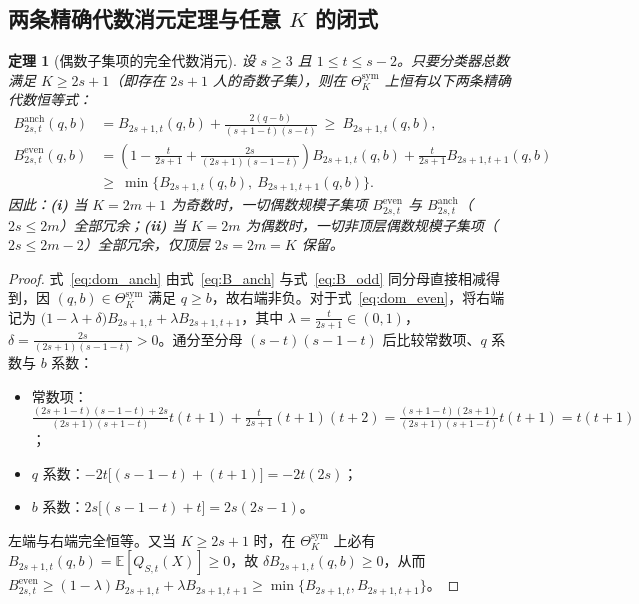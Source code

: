 \documentclass[11pt,a4paper]{article}
\newtheorem{theorem}{定理}[section]
\theoremstyle{definition}
\theoremstyle{remark}
\newcommand{\Thetasym}{\Theta^{\mathrm{sym}}_K}
\begin{document}
\subsection{两条精确代数消元定理与任意 $K$ 的闭式}

\begin{theorem}[偶数子集项的完全代数消元]\label{thm:even_dom}
设 $s \ge 3$ 且 $1 \le t \le s - 2$。只要分类器总数满足 $K \ge 2s + 1$（即存在 $2s+1$ 人的奇数子集），则在 $\Thetasym$ 上恒有以下两条精确代数恒等式：
\begin{align}
  B^{\mathrm{anch}}_{2s, t}(q, b) &= B_{2s+1, t}(q, b) + \frac{2(q - b)}{(s + 1 - t)(s - t)} \ \ge\ B_{2s+1, t}(q, b), \label{eq:dom_anch} \\
  B^{\mathrm{even}}_{2s, t}(q, b) &= \left(1 - \frac{t}{2s+1} + \frac{2s}{(2s+1)(s - 1 - t)}\right) B_{2s+1, t}(q, b) + \frac{t}{2s+1} B_{2s+1, t+1}(q, b) \nonumber \\
  &\ge\ \min\bigl\{ B_{2s+1, t}(q, b),\ B_{2s+1, t+1}(q, b) \bigr\}. \label{eq:dom_even}
\end{align}
因此：\textbf{(i)} 当 $K = 2m+1$ 为奇数时，一切偶数规模子集项 $B^{\mathrm{even}}_{2s, t}$ 与 $B^{\mathrm{anch}}_{2s, t}$（$2s \le 2m$）全部冗余；\textbf{(ii)} 当 $K = 2m$ 为偶数时，一切非顶层偶数规模子集项（$2s \le 2m - 2$）全部冗余，仅顶层 $2s = 2m = K$ 保留。
\end{theorem}
\begin{proof}
式~\eqref{eq:dom_anch} 由式~\eqref{eq:B_anch} 与式~\eqref{eq:B_odd} 同分母直接相减得到，因 $(q, b) \in \Thetasym$ 满足 $q \ge b$，故右端非负。对于式~\eqref{eq:dom_even}，将右端记为 $\bigl(1 - \lambda + \delta\bigr) B_{2s+1, t} + \lambda B_{2s+1, t+1}$，其中 $\lambda = \frac{t}{2s+1} \in (0, 1)$，$\delta = \frac{2s}{(2s+1)(s-1-t)} > 0$。通分至分母 $(s-t)(s-1-t)$ 后比较常数项、$q$ 系数与 $b$ 系数：
\begin{itemize}
  \setlength{\itemsep}{1pt}\setlength{\parskip}{0pt}
  \item 常数项：$\frac{(2s+1-t)(s-1-t) + 2s}{(2s+1)(s+1-t)} t(t+1) + \frac{t}{2s+1}(t+1)(t+2) = \frac{(s+1-t)(2s+1)}{(2s+1)(s+1-t)} t(t+1) = t(t+1)$；
  \item $q$ 系数：$-2t\bigl[(s-1-t) + (t+1)\bigr] = -2t(2s)$；
  \item $b$ 系数：$2s\bigl[(s-1-t) + t\bigr] = 2s(2s-1)$。
\end{itemize}
左端与右端完全恒等。又当 $K \ge 2s+1$ 时，在 $\Thetasym$ 上必有 $B_{2s+1, t}(q, b) = \mathbb{E}[Q_{S, t}(X)] \ge 0$，故 $\delta B_{2s+1, t}(q, b) \ge 0$，从而 $B^{\mathrm{even}}_{2s, t} \ge (1-\lambda) B_{2s+1, t} + \lambda B_{2s+1, t+1} \ge \min\{B_{2s+1, t}, B_{2s+1, t+1}\}$。
\end{proof}
\end{document}
